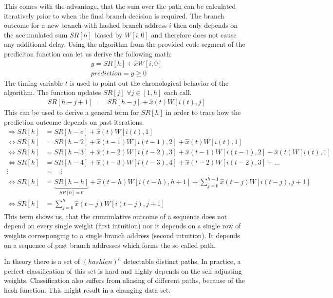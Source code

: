 \documentclass{article}
\begin{document}
This comes with the advantage, that the sum over the path can be calculated iteratively prior to when the final branch decision is required. The branch outcome for a new branch with hashed branch address $i$ then only depends on the accumulated sum $SR[h]$ biased by $W[i,0]$ and therefore does not cause any additional delay. 
Using the algorithm from the provided code segment of the prediciton function can let us derive the following math:
\begin{align*}
	y = SR[h] + \hat{x} W[i,0] \\
	\textit{prediction} = y\geq 0
\end{align*}
The timing variable $t$ is used to point out the chronological behavior of the algorithm. The function updates $SR[j]$ $\forall j \in [1,h]$ each call.
\begin{align*}
	SR[h-j+1] &= SR[h-j] + \hat{x}(t) W[i(t),j] 
\end{align*}
This can be used to derive a general term for $SR[h]$ in order to trace how the prediction outcome depends on past iterations:
\begin{align*}
	\Rightarrow SR[h] &= SR[h-e] + \hat{x}(t) W[i(t),1] \\
	\iff SR[h] &= SR[h-2] + \hat{x}(t-1) W[i(t-1),2] + \hat{x}(t) W[i(t),1] \\
	\iff SR[h] &= SR[h-3] + \hat{x}(t-2) W[i(t-2),3] + \hat{x}(t-1) W[i(t-1),2] + \hat{x}(t) W[i(t),1] \\
	\iff SR[h] &= SR[h-4] + \hat{x}(t-3) W[i(t-3),4] + \hat{x}(t-2) W[i(t-2),3] + \dots \\%
	\vdots \quad &= \quad \vdots \\
	\iff SR[h] &= \underbrace{SR[h-h]}_{SR[0] = 0} + \hat{x}(t-h) W[i(t-h),h+1] + \sum_{j=0}^{h-1} \hat{x}(t-j) W[i(t-j),j+1] \\
	\iff SR[h] &=\sum_{j=0}^{h} \hat{x}(t-j) W[i(t-j),j+1] 
\end{align*}
This term shows us, that the cummulative outcome of a sequence does not depend on every single weight (first intuition) nor it depends on a single row of weights corresponging to a single branch address (second intuition). It depends on a sequence of past branch addresses which forms the so called path.

In theory there is a set of ${(hashlen)}^{h}$ detectable distinct paths. In practice, a perfect classification of this set is hard and highly depends on the self adjusting weights. Classification also suffers from aliasing of different paths, because of the hash function. This might result in a changing data set. 
\end{document}
